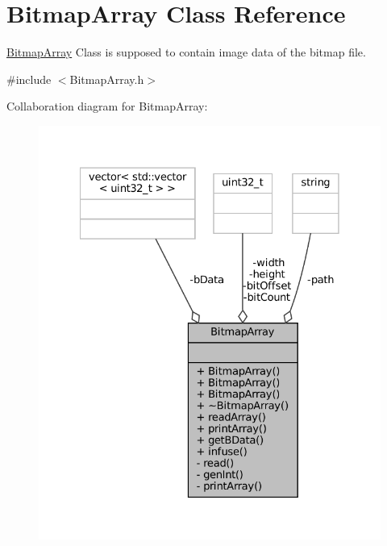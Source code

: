 \hypertarget{classBitmapArray}{}\section{Bitmap\+Array Class Reference}
\label{classBitmapArray}


\mbox{\hyperlink{classBitmapArray}{Bitmap\+Array}} Class is supposed to contain image data of the bitmap file.  




{\ttfamily \#include $<$Bitmap\+Array.\+h$>$}



Collaboration diagram for Bitmap\+Array\+:
\nopagebreak
\begin{figure}[H]
\begin{center}
\leavevmode
\includegraphics[width=328pt]{classBitmapArray__coll__graph}
\end{center}
\end{figure}
